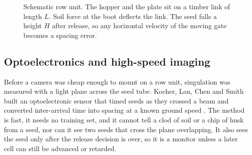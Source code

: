 \begin{figure}[ht]
\centering
{}
\caption{Schematic row unit. The hopper and the plate sit on a timber link of length \(L\). Soil force at the boot deflects the link. The seed falls a height \(H\) after release, so any horizontal velocity of the moving gate becomes a spacing error.}
\label{fig:rowunit}
\end{figure}

\subsection{Optoelectronics and high-speed imaging}

Before a camera was cheap enough to mount on a row unit, singulation was measured with a light plane across the seed tube. Kocher, Lan, Chen and Smith built an optoelectronic sensor that timed seeds as they crossed a beam and converted inter-arrival time into spacing at a known ground speed \cite{kocher1998}. The method is fast, it needs no training set, and it cannot tell a clod of soil or a chip of husk from a seed, nor can it see two seeds that cross the plane overlapping. It also sees the seed only after the release decision is over, so it is a monitor unless a later cell can still be advanced or retarded.

